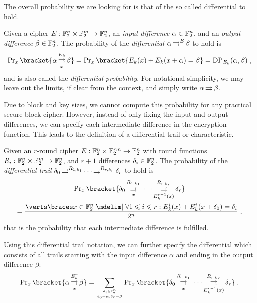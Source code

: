 The overall probability we are looking for is that of the so called differential to hold.
\begin{definition}[Differential]
    Given a cipher $E : \mathbb{F}_2^n \times \mathbb{F}_2^m \to \mathbb{F}_2^n$, an \emph{input difference} $\alpha \in \mathbb{F}_2^n$, and an \emph{output difference} $\beta \in \mathbb{F}_2^n$.
    The probability of the \emph{differential} $\alpha \operatorname*{\rightrightarrows}^{E}_{} \beta$ to hold is
    \begin{equation*}
        \Prob_x\bracket{\propDiff{\alpha}{E_k}{x}{\beta}} = \Prob_x\bracket{E_k(x) + E_k(x + \alpha) = \beta} = \mathrm{DP}_{E_k}(\alpha, \beta)\;,
    \end{equation*}
    and is also called the \emph{differential probability}.
    For notational simplicity, we may leave out the limits, if clear from the context, and simply write $\alpha \operatorname*{\rightrightarrows}^{}_{} \beta$.
\end{definition}

Due to block and key sizes, we cannot compute this probability for any practical secure block cipher.
However, instead of only fixing the input and output differences, we can specify each intermediate difference in the encryption function.
This leads to the definition of a differential trail or characteristic.
\begin{definition}
    Given an $r$-round cipher $E : \mathbb{F}_2^n \times \mathbb{F}_2^{rm} \to \mathbb{F}_2^n$ with round functions $R_i : \mathbb{F}_2^n \times \mathbb{F}_2^m \to \mathbb{F}_2^n$, and $r+1$ differences $\delta_i \in \mathbb{F}_2^n$.
    The probability of the \emph{differential trail} $\delta_0 \operatorname*{\rightrightarrows}^{R_{1,k_1}}_{} \cdots \operatorname*{\rightrightarrows}^{R_{r,k_r}}_{} \delta_{r}$ to hold is
    \begin{gather*}
        \Prob_x\bracket{\propDiff{\delta_0}{R_{1,k_1}}{x}{\propDiff{\ \cdots}{R_{r,k_r}}{E_k^{r-1}(x)}{\delta_{r}}}} \\
        = \frac{\abs{\set{x \in \F_2^n \given \forall 1 \leqslant i \leqslant r : E_k^i(x) + E_k^i(x+\delta_0) = \delta_i}}}{2^n}\;,
    \end{gather*}
    that is the probability that each intermediate difference is fulfilled.
\end{definition}

Using this differential trail notation, we can further specify the differential which consists of all trails starting with the input difference $\alpha$ and ending in the output difference $\beta$:
\begin{equation*}
    \Prob_x\bracket{\propDiff{\alpha}{E_k^r}{x}{\beta}}
    = \sum_{\tower{\delta_i \in \F_2^n}{\delta_0 = \alpha, \delta_r = \beta}}
      \Prob_x\bracket{\propDiff{\delta_0}{R_{1,k_1}}{x}{\propDiff{\ \cdots}{R_{r,k_r}}{E_k^{r-1}(x)}{\delta_{r}}}}\;.
\end{equation*}

